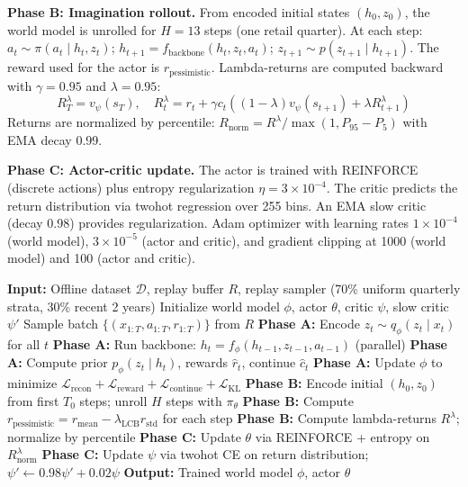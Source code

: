 \textbf{Phase B: Imagination rollout.} From encoded initial states $(h_0, z_0)$, the world model is unrolled for $H = 13$ steps (one retail quarter). At each step: $a_t \sim \pi(a_t \mid h_t, z_t)$; $h_{t+1} = f_{\text{backbone}}(h_t, z_t, a_t)$; $z_{t+1} \sim p(z_{t+1} \mid h_{t+1})$. The reward used for the actor is $r_{\text{pessimistic}}$. Lambda-returns are computed backward with $\gamma = 0.95$ and $\lambda = 0.95$:
\begin{equation}
R^\lambda_T = v_\psi(s_T), \quad R^\lambda_t = r_t + \gamma c_t \left( (1-\lambda) v_\psi(s_{t+1}) + \lambda R^\lambda_{t+1} \right)
\end{equation}
Returns are normalized by percentile: $R_{\text{norm}} = R^\lambda / \max(1, P_{95} - P_5)$ with EMA decay 0.99.

\textbf{Phase C: Actor-critic update.} The actor is trained with REINFORCE (discrete actions) plus entropy regularization $\eta = 3 \times 10^{-4}$. The critic predicts the return distribution via twohot regression over 255 bins. An EMA slow critic (decay 0.98) provides regularization. Adam optimizer with learning rates $1 \times 10^{-4}$ (world model), $3 \times 10^{-5}$ (actor and critic), and gradient clipping at 1000 (world model) and 100 (actor and critic).

\begin{algorithm}[t]
\caption{\dreamprice{} Three-Phase Training Loop}
\label{alg:training}
\begin{algorithmic}[1]
\STATE \textbf{Input:} Offline dataset $\mathcal{D}$, replay buffer $R$, replay sampler (70\% uniform quarterly strata, 30\% recent 2 years)
\STATE Initialize world model $\phi$, actor $\theta$, critic $\psi$, slow critic $\psi'$
\STATE Sample batch $\{(x_{1:T}, a_{1:T}, r_{1:T})\}$ from $R$
\STATE \textbf{Phase A:} Encode $z_t \sim q_\phi(z_t \mid x_t)$ for all $t$
\STATE \textbf{Phase A:} Run backbone: $h_t = f_\phi(h_{t-1}, z_{t-1}, a_{t-1})$ (parallel)
\STATE \textbf{Phase A:} Compute prior $p_\phi(z_t \mid h_t)$, rewards $\hat{r}_t$, continue $\hat{c}_t$
\STATE \textbf{Phase A:} Update $\phi$ to minimize $\mathcal{L}_{\text{recon}} + \mathcal{L}_{\text{reward}} + \mathcal{L}_{\text{continue}} + \mathcal{L}_{\text{KL}}$
\STATE \textbf{Phase B:} Encode initial $(h_0, z_0)$ from first $T_0$ steps; unroll $H$ steps with $\pi_\theta$
\STATE \textbf{Phase B:} Compute $r_{\text{pessimistic}} = r_{\text{mean}} - \lambda_{\text{LCB}} r_{\text{std}}$ for each step
\STATE \textbf{Phase B:} Compute lambda-returns $R^\lambda$; normalize by percentile
\STATE \textbf{Phase C:} Update $\theta$ via REINFORCE + entropy on $R^\lambda_{\text{norm}}$
\STATE \textbf{Phase C:} Update $\psi$ via twohot CE on return distribution; $\psi' \leftarrow 0.98 \psi' + 0.02 \psi$
\ENDFOR
\STATE \textbf{Output:} Trained world model $\phi$, actor $\theta$
\end{algorithmic}
\end{algorithm}

